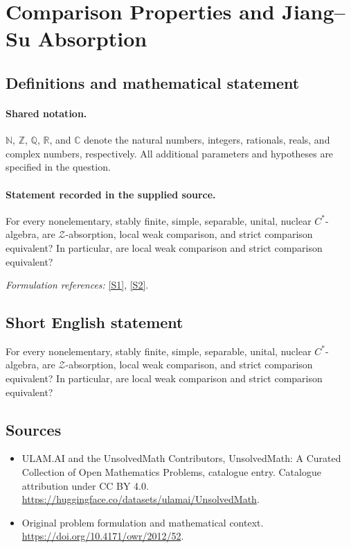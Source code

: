 \documentclass[11pt]{article}
\newcommand{\sref}[2]{\hyperlink{source:#1:#2}{[S#2]}}
\begin{document}
\section{Comparison Properties and Jiang–Su Absorption}\label{statement}

\subsection{Definitions and mathematical statement}

\paragraph{Shared notation.}$\mathbb N$, $\mathbb Z$, $\mathbb Q$, $\mathbb R$, and $\mathbb C$ denote the natural numbers, integers, rationals, reals, and complex numbers, respectively. All additional parameters and hypotheses are specified in the question.


\paragraph{Statement recorded in the supplied source.}
For every nonelementary, stably finite, simple, separable, unital, nuclear $C^*$-algebra, are $\mathcal Z$-absorption, local weak comparison, and strict comparison equivalent? In particular, are local weak comparison and strict comparison equivalent?
\par\smallskip\textit{Formulation references:} \sref{statement}{1}, \sref{statement}{2}.
\subsection{Short English statement}
For every nonelementary, stably finite, simple, separable, unital, nuclear $C^*$-algebra, are $\mathcal Z$-absorption, local weak comparison, and strict comparison equivalent? In particular, are local weak comparison and strict comparison equivalent?
\subsection{Sources}
\begin{itemize}
\item[\hypertarget{source:statement:1}{S1}] ULAM.AI and the UnsolvedMath Contributors, UnsolvedMath: A Curated Collection of Open Mathematics Problems, catalogue entry. Catalogue attribution under CC BY 4.0.
\url{https://huggingface.co/datasets/ulamai/UnsolvedMath}.
\item[\hypertarget{source:statement:2}{S2}] Original problem formulation and mathematical context.
\url{https://doi.org/10.4171/owr/2012/52}.
\end{itemize}
\label{end:statement}
\end{document}
